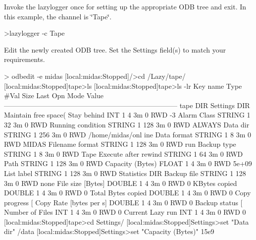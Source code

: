 \begin{DoxyEnumerate}
\item Invoke the lazylogger once for setting up the appropriate ODB tree and exit. In this example, the channel is \char`\"{}Tape\char`\"{}. 
\begin{DoxyCode}
  >lazylogger -c Tape
\end{DoxyCode}
 
\item Edit the newly created ODB tree. Set the Settings field(s) to match your requirements. 
\begin{DoxyCode}
> odbedit -e midas
[local:midas:Stopped]/>cd /Lazy/tape/
[local:midas:Stopped]tape>ls
[local:midas:Stopped]tape>ls -lr
Key name                        Type    #Val  Size  Last Opn Mode Value
---------------------------------------------------------------------------
tape                            DIR
    Settings                    DIR
        Maintain free space(%
        Stay behind             INT     1     4     3m   0   RWD  -3
        Alarm Class             STRING  1     32    3m   0   RWD  
        Running condition       STRING  1     128   3m   0   RWD  ALWAYS
        Data dir                STRING  1     256   3m   0   RWD  /home/midas/onl
      ine
        Data format             STRING  1     8     3m   0   RWD  MIDAS
        Filename format         STRING  1     128   3m   0   RWD  run%
        Backup type             STRING  1     8     3m   0   RWD  Tape
        Execute after rewind    STRING  1     64    3m   0   RWD  
        Path                    STRING  1     128   3m   0   RWD  
        Capacity (Bytes)        FLOAT   1     4     3m   0   RWD  5e+09
        List label              STRING  1     128   3m   0   RWD  
    Statistics                  DIR
        Backup file             STRING  1     128   3m   0   RWD  none 
        File size [Bytes]       DOUBLE  1     4     3m   0   RWD  0
        KBytes copied           DOUBLE  1     4     3m   0   RWD  0
        Total Bytes copied      DOUBLE  1     4     3m   0   RWD  0
        Copy progress [%
        Copy Rate [bytes per s] DOUBLE  1     4     3m   0   RWD  0
        Backup status [%
        Number of Files         INT     1     4     3m   0   RWD  0
        Current Lazy run        INT     1     4     3m   0   RWD  0
[local:midas:Stopped]tape>cd Settings/
[local:midas:Stopped]Settings>set "Data dir" /data
[local:midas:Stopped]Settings>set "Capacity (Bytes)" 15e9
\end{DoxyCode}
 

\end{DoxyEnumerate}
